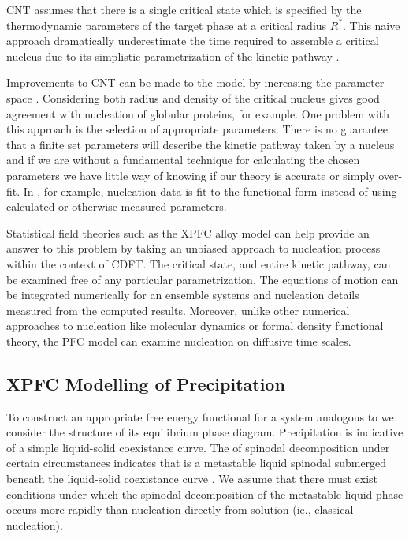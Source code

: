 
CNT assumes that there is a single critical state which is specified by the
thermodynamic parameters of the target phase at a critical radius $R^*$. This
naive approach dramatically underestimate the time required to assemble a
critical nucleus due to its simplistic parametrization of the kinetic pathway
\cite{LUTSKO15, MYERSON04, MYERSON09}.

Improvements to CNT can be made to the model by increasing the parameter space .
Considering both radius and density of the critical nucleus \cite{LUTSKO15} gives good agreement with
nucleation of globular proteins, for example. One problem with this approach is
the selection of appropriate parameters. There is no guarantee that a finite
set parameters will describe the kinetic pathway taken by a nucleus and if we
are without a fundamental technique for calculating the chosen parameters we
have little way of knowing if our theory is accurate or simply over-fit. In
\cite{MYERSON09}, for example, nucleation data is fit to the functional form
instead of using calculated or otherwise measured parameters.


Statistical field theories such as the XPFC alloy model can help provide an
answer to this problem by taking an unbiased approach to nucleation process
within the context of CDFT.  The critical state, and entire kinetic pathway,
can be examined free of any particular parametrization. The equations of motion
can be integrated numerically for an ensemble systems and nucleation details
measured from the computed results.  Moreover, unlike other numerical
approaches to nucleation like molecular dynamics or formal density functional
theory, the PFC model can examine nucleation on diffusive time scales.

\subsection{XPFC Modelling of Precipitation} %


To construct an appropriate free energy functional for a system analogous to 
 we consider
the structure of its equilibrium phase diagram. Precipitation is indicative of
a simple liquid-solid coexistance curve. The  of spinodal decomposition
under certain circumstances indicates that is a metastable liquid spinodal
submerged beneath the liquid-solid coexistance curve \cite{DAVEY13}. We assume
that there must exist conditions under which the spinodal decomposition of the
metastable liquid phase occurs more rapidly than nucleation directly from
solution (ie., classical nucleation).

